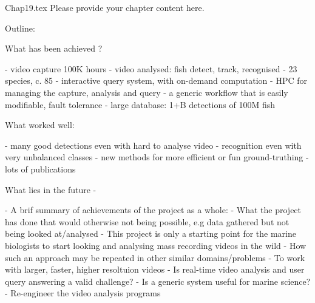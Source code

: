 Chap19.tex
Please provide your chapter content here. 

Outline: 

What has been achieved ?

 - video capture 100K hours
 - video analysed: fish detect, track, recognised
 - 23 species, c. 85%
 - interactive query system, with on-demand computation
 - HPC for managing the capture, analysis and query
 - a generic workflow that is easily modifiable, fault tolerance
 - large database: 1+B detections of 100M fish 
 
What worked well:
 
- many good detections even with hard to analyse video
- recognition even with very unbalanced classes
- new methods for more efficient or fun ground-truthing
- lots of publications 

What lies in the future - 

- A brif summary of achievements of the project as a whole:
- What the project has done that would otherwise not being possible, 
  e.g data gathered but not being looked at/analysed
- This project is only a starting point for the marine biologists to 
  start looking and analysing mass recording videos in the wild 
- How such an approach may be repeated in other similar domains/problems
- To work with larger, faster, higher resoltuion videos
- Is real-time video analysis and user query answering a valid challenge?
- Is a generic system useful for marine science?
- Re-engineer the video analysis programs 
